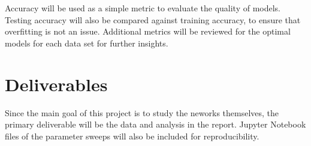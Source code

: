 \documentclass{article}
\begin{document}
Accuracy will be used as a simple metric to evaluate the quality of models. Testing accuracy will also be compared against training accuracy, to ensure that overfitting is not an issue. Additional metrics will be reviewed for the optimal models for each data set for further insights.

\section{Deliverables}

Since the main goal of this project is to study the neworks themselves, the primary deliverable will be the data and analysis in the report. Jupyter Notebook files of the parameter sweeps will also be included for reproducibility.
\end{document}
